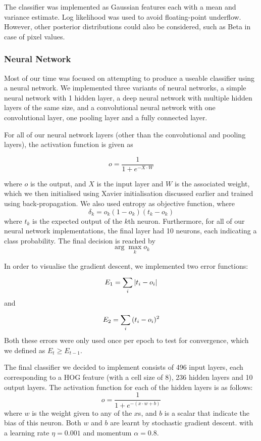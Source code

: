 \documentclass{article} %
\begin{document}
The classifier was implemented as Gaussian features each with a mean and variance estimate. Log likelihood was used to avoid floating-point underflow. However, other posterior distributions could also be considered, such as Beta in case of pixel values.

\subsubsection{Neural Network}
Most of our time was focused on attempting to produce a useable classifier using a neural network. We implemented three variants of neural networks, a simple neural network with 1 hidden layer, a deep neural network with multiple hidden layers of the same size, and a convolutional neural network with one convolutional layer, one pooling layer and a fully connected layer.

For all of our neural network layers (other than the convolutional and pooling layers), the activation function is given as

$$o = \frac{1}{1+e^{-X\cdot W}}$$

where $o$ is the output, and $X$ is the input layer and $W$ is the associated weight, which we then initialised using Xavier initialisation discussed earlier and trained using back-propagation.
We also used entropy as objective function, where
$$\delta_k = o_k(1-o_k)(t_k-o_k)$$
where $t_k$ is the expected output of the $k$th neuron. Furthermore, for all of our neural network implementations, the final layer had 10 neurons, each indicating a class probability. The final decision is reached by 
$$\arg\max_k o_k$$

In order to visualise the gradient descent, we implemented two error functions:
  $$E_1 = \sum^{}_{i}{|t_i-o_i|}$$
and
  $$E_2 = \sum^{}_{i}{(t_i-o_i)^2}$$
Both these errors were only used once per epoch to test for convergence, which we defined as $E_{t}\geq E_{t-1}$.

The final classifier we decided to implement consists of 496 input layers, each corresponding to a HOG feature (with a cell size of 8), 236 hidden layers and 10 output layers. The activation function for each of the hidden layers is as follows:
  $$o = \frac{1}{1+e^{-(x\cdot w+b)}}$$
where $w$ is the weight given to any of the $x$s, and $b$ is a scalar that indicate the bias of this neuron. Both $w$ and $b$ are learnt by stochastic gradient descent. with a learning rate $\eta=0.001$ and momentum $\alpha=0.8$.
\end{document}
